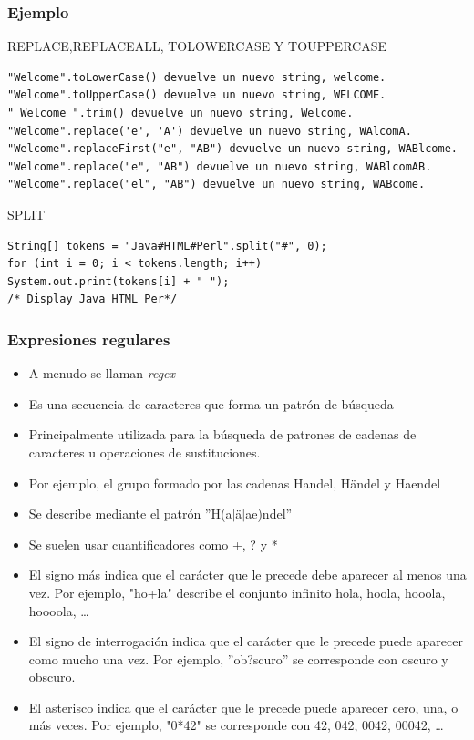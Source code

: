 \documentclass{beamer}
\begin{document}
\begin{frame}[fragile]
    \frametitle{Ejemplo}
\begin{footnotesize}
\begin{block}{REPLACE,REPLACEALL, TOLOWERCASE Y TOUPPERCASE}
\begin{verbatim}
"Welcome".toLowerCase() devuelve un nuevo string, welcome.
"Welcome".toUpperCase() devuelve un nuevo string, WELCOME.
" Welcome ".trim() devuelve un nuevo string, Welcome.
"Welcome".replace('e', 'A') devuelve un nuevo string, WAlcomA.
"Welcome".replaceFirst("e", "AB") devuelve un nuevo string, WABlcome.
"Welcome".replace("e", "AB") devuelve un nuevo string, WABlcomAB.
"Welcome".replace("el", "AB") devuelve un nuevo string, WABcome.
\end{verbatim} 
\end{block}
\pause
\begin{block}{SPLIT}
\begin{verbatim}
String[] tokens = "Java#HTML#Perl".split("#", 0);
for (int i = 0; i < tokens.length; i++)
System.out.print(tokens[i] + " ");
/* Display Java HTML Per*/
\end{verbatim}
\end{block}
\end{footnotesize}
\end{frame}


\begin{frame}[fragile]
    \frametitle{Expresiones regulares}
    \begin{itemize}[<+->]
    \item A menudo se llaman \emph{regex}
    \item Es una secuencia de caracteres que forma un patrón de búsqueda
    \item Principalmente utilizada para la búsqueda de patrones de cadenas de caracteres u operaciones de sustituciones.
    \item Por ejemplo, el grupo formado por las cadenas Handel, Händel y Haendel
    \item Se describe mediante el patrón ''H(a$|$ä$|$ae)ndel''
    \item Se suelen usar cuantificadores como +, ? y *
    \item El signo más indica que el carácter que le precede debe aparecer al menos una vez. Por ejemplo, "ho+la" describe el conjunto infinito hola, hoola, hooola, hoooola, \dots
    \item El signo de interrogación indica que el carácter que le precede puede aparecer como mucho una vez. Por ejemplo, ''ob?scuro'' se corresponde con oscuro y obscuro.
    \item El asterisco indica que el carácter que le precede puede aparecer cero, una, o más veces. Por ejemplo, "0*42" se corresponde con 42, 042, 0042, 00042, \dots
    \end{itemize}

\end{frame}
\end{document}
